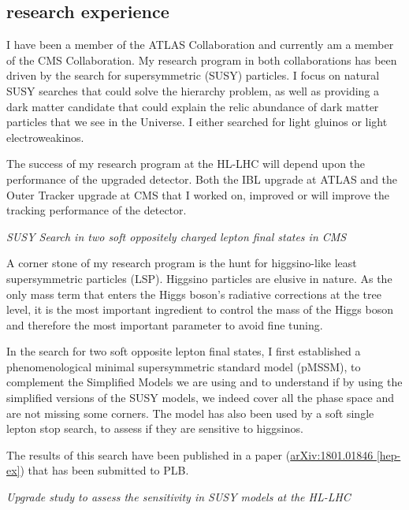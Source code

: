 \documentclass[]{cv} %
\begin{document}
\ifresume
\begin{resume}
\section{research experience}

I have been a member of the ATLAS Collaboration and currently am a member of the
CMS Collaboration. My research program in both collaborations has been driven by
the search for supersymmetric (SUSY) particles. I focus on natural SUSY searches
that could solve the hierarchy problem, as well as providing a dark matter
candidate that could explain the relic abundance of dark matter particles that
we see in the Universe. I either searched for light gluinos or light
electroweakinos.

The success of my research program at the HL-LHC will depend upon the
performance of the upgraded detector. Both the IBL upgrade at ATLAS and
the Outer Tracker upgrade at CMS that I worked on, improved or will improve the
tracking performance of the detector.

\vspace{15pt}
\Large{}
\textit{SUSY Search in two soft oppositely charged lepton final states in CMS}
\normalsize{}

A corner stone of my research program is the hunt for higgsino-like least
supersymmetric particles (LSP). Higgsino particles are elusive in nature.  As
the only mass term that enters the Higgs boson's radiative corrections at the
tree level, it is the most important ingredient to control the mass of the Higgs
boson and therefore the most important parameter to avoid fine tuning.

In the search for two soft opposite lepton final states, I first established a
phenomenological minimal supersymmetric standard model (pMSSM), to complement
the Simplified Models we are using and to understand if by using the simplified
versions of the SUSY models, we indeed cover all the phase space and are not
missing some corners. The model has also been used by a soft single lepton stop
search, to assess if they are sensitive to higgsinos.

The results of this search have been published in a paper
(\href{https://arxiv.org/abs/1801.01846}{arXiv:1801.01846 [hep-ex]}) that has
been submitted to PLB.

\vspace{15pt}
\Large{}
\textit{Upgrade study to assess the sensitivity in SUSY models at the HL-LHC} \\
\normalsize{}


\end{resume}
\end{document}
